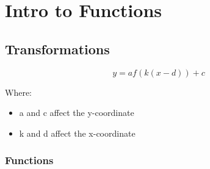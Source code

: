 \documentclass{article}
\begin{document}
\section{Intro to Functions}

\subsection{Transformations}

\[ y = af(k(x-d))+c \]

\noindent
Where:
\begin{itemize}
	\item a and c affect the y-coordinate
	\item k and d affect the x-coordinate
\end{itemize}

\subsubsection*{Functions}
\end{document}
